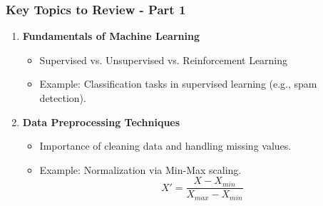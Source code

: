 \documentclass[aspectratio=169]{beamer}
\begin{document}
\begin{frame}[fragile]
    \frametitle{Key Topics to Review - Part 1}
    \begin{enumerate}
        \item \textbf{Fundamentals of Machine Learning}
        \begin{itemize}
            \item Supervised vs. Unsupervised vs. Reinforcement Learning
            \item Example: Classification tasks in supervised learning (e.g., spam detection).
        \end{itemize}

        \item \textbf{Data Preprocessing Techniques}
        \begin{itemize}
            \item Importance of cleaning data and handling missing values.
            \item Example: Normalization via Min-Max scaling.
            \begin{equation}
                X' = \frac{X - X_{min}}{X_{max} - X_{min}}
            \end{equation}
        \end{itemize}
    \end{enumerate}
\end{frame}
\end{document}
